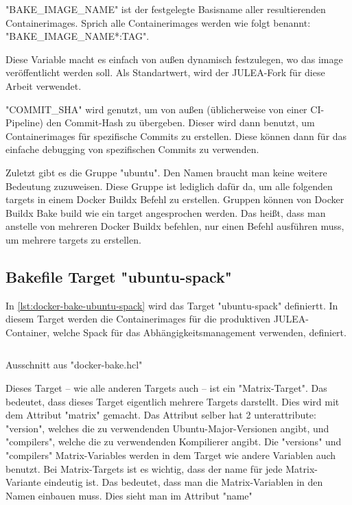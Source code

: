 "BAKE\_IMAGE\_NAME" ist der festgelegte Basisname aller resultierenden Containerimages. Sprich alle Containerimages werden wie folgt benannt: "BAKE\_IMAGE\_NAME*:TAG".

Diese Variable macht es einfach von außen dynamisch festzulegen, wo das image veröffentlicht werden soll. Als Standartwert, wird der JULEA-Fork für diese Arbeit verwendet.

"COMMIT\_SHA" wird genutzt, um von außen (üblicherweise von einer CI-Pipeline) den Commit-Hash zu übergeben. Dieser wird dann benutzt, um Containerimages für spezifische Commits zu erstellen. Diese können dann für das einfache debugging von spezifischen Commits zu verwenden.

Zuletzt gibt es die Gruppe "ubuntu". Den Namen braucht man keine weitere Bedeutung zuzuweisen. Diese Gruppe ist lediglich dafür da, um alle folgenden targets in einem Docker Buildx Befehl zu erstellen. Gruppen können von Docker Buildx Bake build wie ein target angesprochen werden. Das heißt, dass man anstelle von mehreren Docker Buildx befehlen, nur einen Befehl ausführen muss, um mehrere targets zu erstellen.

\subsection{Bakefile Target "ubuntu-spack"} \label{ubuntu-spack-target}

In \cref{lst:docker-bake-ubuntu-spack} wird das Target "ubuntu-spack" definiertt. In diesem Target werden die Containerimages für die produktiven JULEA-Container, welche Spack für das Abhängigkeitsmanagement verwenden, definiert.

\begin{listing}[H]
    \inputminted[firstline=9,lastline=27]{./lexers/docker-bake-lexer.py}{./code-examples/docker-bake.hcl}
    \caption{Ausschnitt aus "docker-bake.hcl"}
    \label{lst:docker-bake-ubuntu-spack}
\end{listing}


Dieses Target – wie alle anderen Targets auch – ist ein "Matrix-Target". Das bedeutet, dass dieses Target eigentlich mehrere Targets darstellt. Dies wird mit dem Attribut "matrix" gemacht. Das Attribut selber hat 2 unterattribute: "version", welches die zu verwendenden Ubuntu-Major-Versionen angibt, und "compilers", welche die zu verwendenden Kompilierer angibt.
Die "versions" und "compilers" Matrix-Variables werden in dem Target wie andere Variablen auch benutzt. 
Bei Matrix-Targets ist es wichtig, dass der name für jede Matrix-Variante eindeutig ist. Das bedeutet, dass man die Matrix-Variablen in den Namen einbauen muss. Dies sieht man im Attribut "name"


